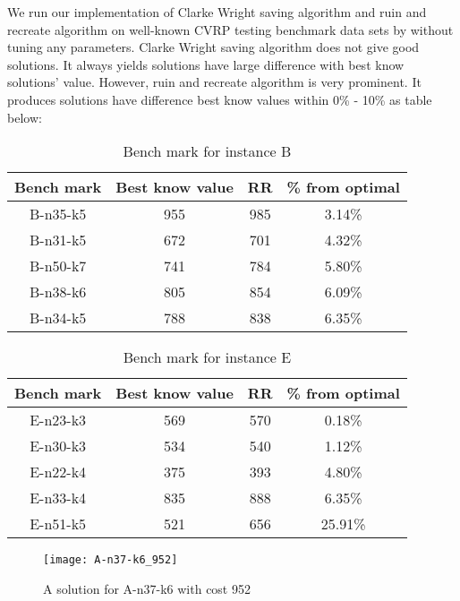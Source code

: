 \documentclass[../main.tex]{}
\begin{document}
We run our implementation of Clarke Wright saving algorithm and ruin and recreate algorithm on well-known CVRP testing benchmark data sets by without tuning any parameters. Clarke Wright saving algorithm does not give good solutions. It always yields solutions have large difference with best know solutions' value. However, ruin and recreate algorithm is very prominent. It produces solutions have difference best know values within 0\% - 10\% as table below:
\begin{table}[h]
\renewcommand{\arraystretch}{1.3}
\caption{Bench mark for instance B}
\label{tb:bnch_ins_b}
\centering
\begin{tabular}{|c|c|c|c|}
\hline
\bfseries Bench mark & \bfseries Best know value & \bfseries RR & \bfseries \% from optimal \\
\hline
B-n35-k5 & 955 & 985 & 3.14\%\\
B-n31-k5 & 672 & 701 & 4.32\%\\
B-n50-k7 & 741 & 784 & 5.80\%\\
B-n38-k6 & 805 & 854 & 6.09\%\\
B-n34-k5 & 788 & 838 & 6.35\%\\
\hline
\end{tabular}
\end{table}

\begin{table}[h]
\renewcommand{\arraystretch}{1.3}
\caption{Bench mark for instance E}
\label{tb:bnch_ins_e}
\centering
\begin{tabular}{|c|c|c|c|}
\hline
\bfseries Bench mark & \bfseries Best know value & \bfseries RR & \bfseries \% from optimal \\
\hline
E-n23-k3 & 569 & 570 & 0.18\%\\
E-n30-k3 & 534 & 540 & 1.12\%\\
E-n22-k4 & 375 & 393 & 4.80\%\\
E-n33-k4 & 835 & 888 & 6.35\%\\
E-n51-k5 & 521 & 656 & 25.91\%\\
\hline
\end{tabular}
\end{table}

\begin{figure}[!t]
\centering
\texttt{[image: A-n37-k6\_952]}
\caption{A solution for A-n37-k6 with cost 952}
\label{fig_sim}
\end{figure}
\end{document}
